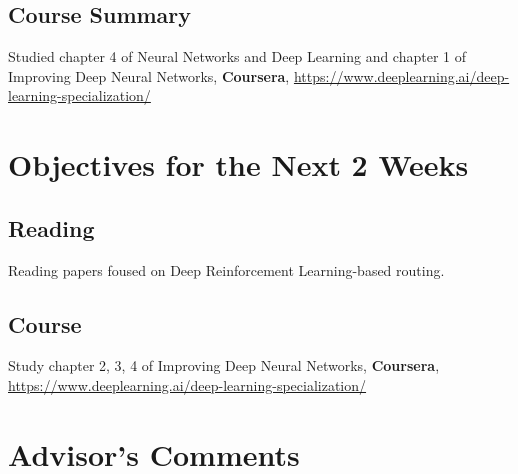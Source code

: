 \documentclass[11pt]{report}
\begin{document}
	\subsection{Course Summary}
	Studied chapter 4 of Neural Networks and Deep Learning and chapter 1 of Improving Deep Neural Networks, \textbf{Coursera}, \url{https://www.deeplearning.ai/deep-learning-specialization/}
	
	\section{Objectives for the Next 2 Weeks}
	\subsection{Reading} 
	Reading papers foused on Deep Reinforcement Learning-based routing.
	\subsection{Course} 
	Study chapter 2, 3, 4 of Improving Deep Neural Networks, \textbf{Coursera}, \url{https://www.deeplearning.ai/deep-learning-specialization/}
	
	\section{Advisor's Comments}
	
	
	
	
\end{document}
